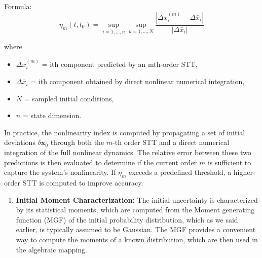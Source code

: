 \documentclass[
  letterpaper,
  DIV=11,
  numbers=noendperiod,
  oneside]{scrartcl}
\providecommand{\tightlist}{%
  \setlength{\itemsep}{0pt}\setlength{\parskip}{0pt}}
\newcounter{quartocallouttipno}
\newcommand{\quartocallouttip}[1]{\refstepcounter{quartocallouttipno}\label{#1}}
\begin{document}
\begin{tcolorbox}[enhanced jigsaw, arc=.35mm, bottomrule=.15mm, bottomtitle=1mm, breakable, colback=white, colbacktitle=quarto-callout-tip-color!10!white, colframe=quarto-callout-tip-color-frame, coltitle=black, left=2mm, leftrule=.75mm, opacityback=0, opacitybacktitle=0.6, rightrule=.15mm, title=\textcolor{quarto-callout-tip-color}{\faLightbulb}\hspace{0.5em}{Tip \ref*{tip-nonlinearity-index}: Local Nonlinearity Index for STT Order Selection}, titlerule=0mm, toprule=.15mm, toptitle=1mm]

\quartocallouttip{tip-nonlinearity-index} 

Formula: \[
\eta_m(t,t_0)=\sup_{i=1,\ldots,n}\sup_{k=1,\ldots,N}\frac{\left|\Delta x_i^{(m)}-\Delta\bar x_i\right|}{\left|\Delta\bar x_i\right|}
\]

where

\begin{itemize}
\tightlist
\item
  \(\Delta x_i^{(m)}\) = ith component predicted by an mth-order STT,
\item
  \(\Delta\bar x_i\) = ith component obtained by direct nonlinear
  numerical integration,
\item
  \(N\) = sampled initial conditions,
\item
  \(n\) = state dimension.
\end{itemize}

In practice, the nonlinearity index is computed by propagating a set of
initial deviations \(\delta \mathbf{x}_0\) through both the \(m\)-th
order STT and a direct numerical integration of the full nonlinear
dynamics. The relative error between these two predictions is then
evaluated to determine if the current order \(m\) is sufficient to
capture the system's nonlinearity. If \(\eta_m\) exceeds a predefined
threshold, a higher-order STT is computed to improve accuracy.

\end{tcolorbox}

\begin{enumerate}
\def\labelenumi{\arabic{enumi}.}
\setcounter{enumi}{1}
\tightlist
\item
  \textbf{Initial Moment Characterization:} The initial uncertainty is
  characterized by its statistical moments, which are computed from the
  Moment generating function (MGF) of the initial probability
  distribution, which as we said earlier, is typically assumed to be
  Gaussian. The MGF provides a convenient way to compute the moments of
  a known distribution, which are then used in the algebraic mapping.
\end{enumerate}
\end{document}
